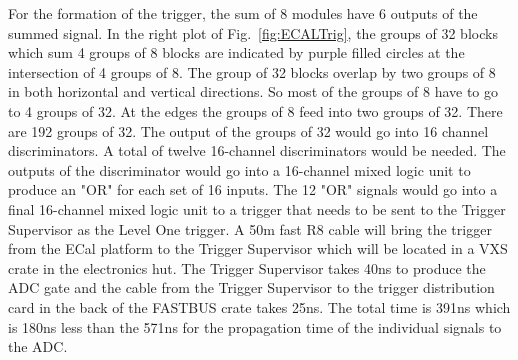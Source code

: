 \documentclass{article}
\begin{document}
 For the formation of the trigger, the sum of 8 modules have 6 outputs of the summed signal.
 In the right plot of Fig.~\ref{fig:ECALTrig}, the groups of 32 blocks which sum 4 groups of
 8 blocks are indicated by purple filled circles at the intersection of 4 groups of 8. 
 The group of 32 blocks overlap
 by two groups of 8 in both horizontal and vertical directions. So most of the
 groups of 8 have to go to 4 groups of 32. At the edges the groups of 8 feed into
 two groups of 32. There are 192  groups of 32. The output of the groups of 32 would go into 16 channel
 discriminators. A total of twelve 16-channel discriminators would be needed. The  outputs of the
 discriminator would go into a 16-channel mixed logic unit to produce an "OR" for each set of
 16 inputs. The 12 "OR" signals would go into a final 16-channel mixed logic unit to 
 a trigger that needs to be sent to the Trigger Supervisor as the Level One trigger. A 50m fast R8 cable will bring the trigger from the ECal platform to the Trigger Supervisor
 which will be located in a VXS crate in the electronics hut. The Trigger Supervisor
 takes 40ns to produce the ADC gate and the cable from the Trigger Supervisor to the
 trigger distribution card in the back of the FASTBUS crate takes 25ns. The total time
 is 391ns which is 180ns less than the 571ns for the propagation time of the individual
 signals to the ADC.
 
\end{document}
